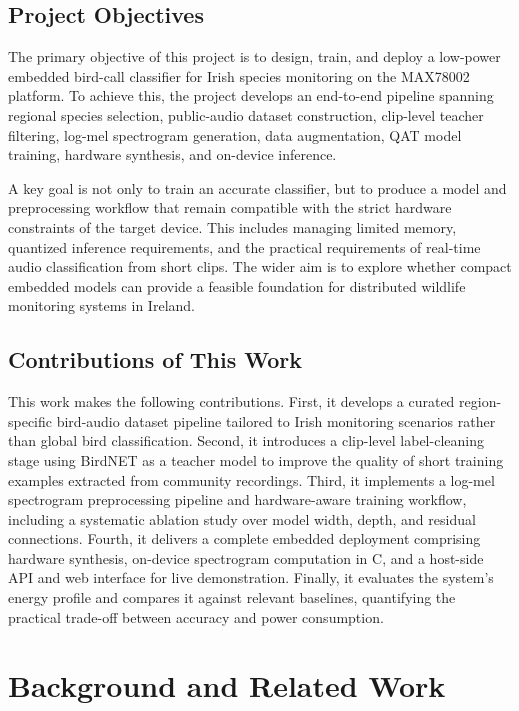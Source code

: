 \documentclass[conference]{IEEEtran}
\begin{document}
\subsection{Project Objectives}
The primary objective of this project is to design, train, and deploy a low-power embedded bird-call classifier for Irish species monitoring on the MAX78002 platform. To achieve this, the project develops an end-to-end pipeline spanning regional species selection, public-audio dataset construction, clip-level teacher filtering, log-mel spectrogram generation, data augmentation, QAT model training, hardware synthesis, and on-device inference.

A key goal is not only to train an accurate classifier, but to produce a model and preprocessing workflow that remain compatible with the strict hardware constraints of the target device. This includes managing limited memory, quantized inference requirements, and the practical requirements of real-time audio classification from short clips. The wider aim is to explore whether compact embedded models can provide a feasible foundation for distributed wildlife monitoring systems in Ireland.

\subsection{Contributions of This Work}
This work makes the following contributions. First, it develops a curated region-specific bird-audio dataset pipeline tailored to Irish monitoring scenarios rather than global bird classification. Second, it introduces a clip-level label-cleaning stage using BirdNET as a teacher model to improve the quality of short training examples extracted from community recordings. Third, it implements a log-mel spectrogram preprocessing pipeline and hardware-aware training workflow, including a systematic ablation study over model width, depth, and residual connections. Fourth, it delivers a complete embedded deployment comprising hardware synthesis, on-device spectrogram computation in C, and a host-side API and web interface for live demonstration. Finally, it evaluates the system's energy profile and compares it against relevant baselines, quantifying the practical trade-off between accuracy and power consumption.

\section{Background and Related Work}
\end{document}
